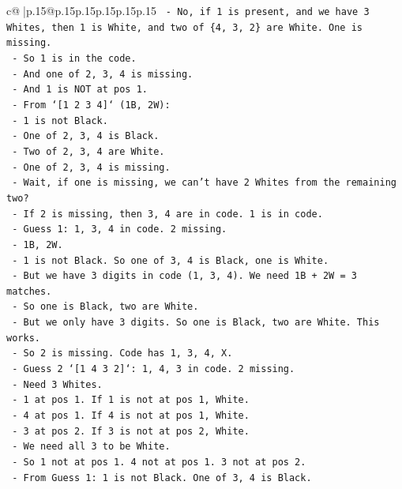 \documentclass{article}
\begin{document}
{\begin{supertabular}{c@{$\;$}|p{.15\linewidth}@{}p{.15\linewidth}p{.15\linewidth}p{.15\linewidth}p{.15\linewidth}p{.15\linewidth}}
{{{\texttt{    {-} No, if 1 is present, and we have 3 Whites, then 1 is White, and two of \{4, 3, 2\} are White. One is missing.} \\
\texttt{    {-} So 1 is in the code.} \\
\texttt{    {-} And one of 2, 3, 4 is missing.} \\
\texttt{    {-} And 1 is NOT at pos 1.} \\
\texttt{    {-} From `{[}1 2 3 4{]}` (1B, 2W):} \\
\texttt{      {-} 1 is not Black.} \\
\texttt{      {-} One of 2, 3, 4 is Black.} \\
\texttt{      {-} Two of 2, 3, 4 are White.} \\
\texttt{      {-} One of 2, 3, 4 is missing.} \\
\texttt{      {-} Wait, if one is missing, we can't have 2 Whites from the remaining two?} \\
\texttt{      {-} If 2 is missing, then 3, 4 are in code. 1 is in code.} \\
\texttt{      {-} Guess 1: 1, 3, 4 in code. 2 missing.} \\
\texttt{      {-} 1B, 2W.} \\
\texttt{      {-} 1 is not Black. So one of 3, 4 is Black, one is White.} \\
\texttt{      {-} But we have 3 digits in code (1, 3, 4). We need 1B + 2W = 3 matches.} \\
\texttt{      {-} So one is Black, two are White.} \\
\texttt{      {-} But we only have 3 digits. So one is Black, two are White. This works.} \\
\texttt{      {-} So 2 is missing. Code has 1, 3, 4, X.} \\
\texttt{      {-} Guess 2 `{[}1 4 3 2{]}`: 1, 4, 3 in code. 2 missing.} \\
\texttt{      {-} Need 3 Whites.} \\
\texttt{      {-} 1 at pos 1. If 1 is not at pos 1, White.} \\
\texttt{      {-} 4 at pos 1. If 4 is not at pos 1, White.} \\
\texttt{      {-} 3 at pos 2. If 3 is not at pos 2, White.} \\
\texttt{      {-} We need all 3 to be White.} \\
\texttt{      {-} So 1 not at pos 1. 4 not at pos 1. 3 not at pos 2.} \\
\texttt{      {-} From Guess 1: 1 is not Black. One of 3, 4 is Black.} \\
}}}
\end{supertabular}}
\end{document}
